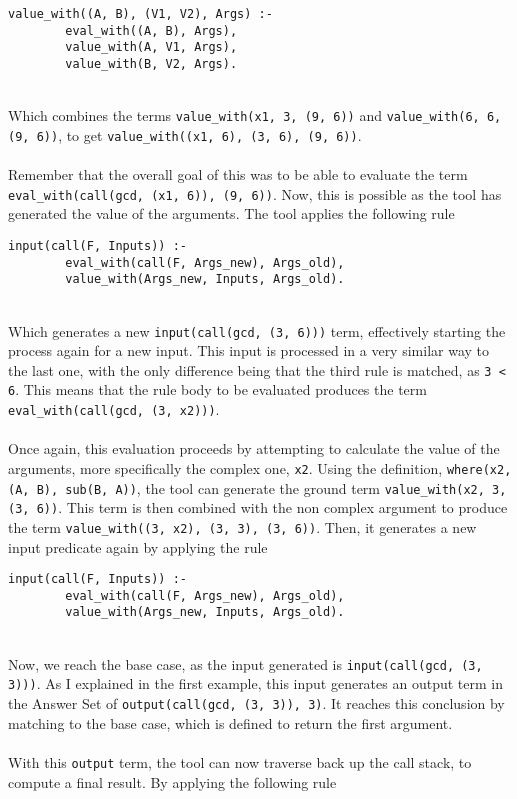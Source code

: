 \begin{lstlisting}
value_with((A, B), (V1, V2), Args) :- 
		eval_with((A, B), Args), 
		value_with(A, V1, Args), 
		value_with(B, V2, Args).
\end{lstlisting}
\mbox{} \\
Which combines the terms \lstinline{value_with(x1, 3, (9, 6))} and \lstinline{value_with(6, 6, (9, 6))}, to get \lstinline{value_with((x1, 6), (3, 6), (9, 6))}. \\ \\ %
Remember that the overall goal of this was to be able to evaluate the term \lstinline{eval_with(call(gcd, (x1, 6)), (9, 6))}. Now, this is possible as the tool has generated the value of the arguments. The tool applies the following rule \\ %

\begin{lstlisting}
input(call(F, Inputs)) :- 
		eval_with(call(F, Args_new), Args_old), 
		value_with(Args_new, Inputs, Args_old).
\end{lstlisting}
\mbox{} \\
Which generates a new \lstinline{input(call(gcd, (3, 6)))} term, effectively starting the process again for a new input. This input is processed in a very similar way to the last one, with the only difference being that the third rule is matched, as \lstinline{3 < 6}. This means that the rule body to be evaluated produces the term \lstinline{eval_with(call(gcd, (3, x2)))}. \\ \\%
Once again, this evaluation proceeds by attempting to calculate the value of the arguments, more specifically the complex one, \lstinline{x2}. Using the definition, \lstinline{where(x2, (A, B), sub(B, A))}, the tool can generate the ground term \lstinline{value_with(x2, 3, (3, 6))}. This term is then combined with the non complex argument to produce the term \lstinline{value_with((3, x2), (3, 3), (3, 6))}. Then, it generates a new input predicate again by applying the rule \\ 

\begin{lstlisting}
input(call(F, Inputs)) :- 
		eval_with(call(F, Args_new), Args_old), 
		value_with(Args_new, Inputs, Args_old).
\end{lstlisting}
\mbox{} \\
Now, we reach the base case, as the input generated is \lstinline{input(call(gcd, (3, 3)))}. As I explained in the first example, this input generates an output term in the Answer Set of \lstinline{output(call(gcd, (3, 3)), 3)}. It reaches this conclusion by matching to the base case, which is defined to return the first argument. \\ \\
With this \lstinline{output} term, the tool can now traverse back up the call stack, to compute a final result. By applying the following rule \\ %

